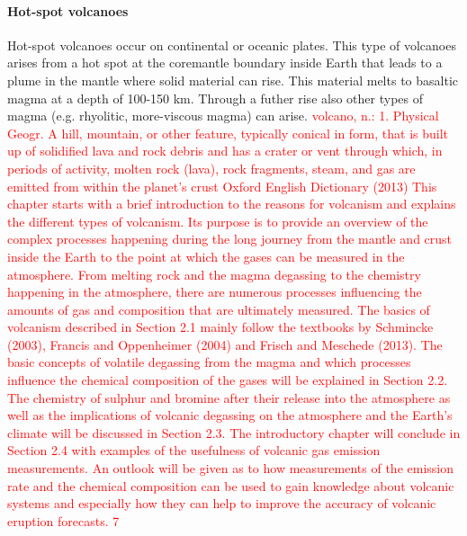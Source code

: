 \documentclass  [
  paper    = a4,
  BCOR     = 10mm,
  twoside,
  fontsize = 12pt,
  fleqn,
  toc      = bibnumbered,
  toc      = listofnumbered,
  numbers  = noendperiod,
  headings = normal,
  listof   = leveldown,
  version  = 3.03
]                                       {scrreprt}
\begin{document}
\paragraph{ Hot-spot volcanoes} Hot-spot volcanoes occur on continental or oceanic plates. This type of volcanoes arises from a hot spot at the coremantle boundary inside Earth that leads to a plume in the mantle where solid material can rise. This material melts to basaltic magma at a depth of 100-150 km. Through a futher rise also other types of magma (e.g. rhyolitic, more-viscous magma) can arise.
\textcolor{red}{
	volcano, n.: 1. Physical Geogr. A hill, mountain, or other feature, typically
	conical in form, that is built up of solidified lava and rock debris and has a crater
	or vent through which, in periods of activity, molten rock (lava), rock fragments,
	steam, and gas are emitted from within the planet’s crust
	Oxford English Dictionary (2013)
	This chapter starts with a brief introduction to the reasons for volcanism and
	explains the different types of volcanism. Its purpose is to provide an overview
	of the complex processes happening during the long journey from the mantle
	and crust inside the Earth to the point at which the gases can be measured in
	the atmosphere.
	From melting rock and the magma degassing to the chemistry happening in
	the atmosphere, there are numerous processes influencing the amounts of gas and
	composition that are ultimately measured. The basics of volcanism described
	in Section 2.1 mainly follow the textbooks by Schmincke (2003), Francis and
	Oppenheimer (2004) and Frisch and Meschede (2013). The basic concepts of
	volatile degassing from the magma and which processes influence the chemical
	composition of the gases will be explained in Section 2.2. The chemistry of
	sulphur and bromine after their release into the atmosphere as well as the
	implications of volcanic degassing on the atmosphere and the Earth’s climate will
	be discussed in Section 2.3. The introductory chapter will conclude in Section 2.4
	with examples of the usefulness of volcanic gas emission measurements. An
	outlook will be given as to how measurements of the  emission rate and the
	chemical composition can be used to gain knowledge about volcanic systems
	and especially how they can help to improve the accuracy of volcanic eruption
	forecasts.
	7
}
\end{document}
